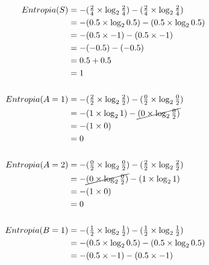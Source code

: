 \documentclass[
    article,            %
    11pt,               %
    oneside,            %
    a4paper,            %
    english,            %
    brazil,             %
    sumario=tradicional,
    ]{abntex2}
\begin{document}
\begin{align*}
Entropia(S) &= - (\tfrac{2}{4} \times \log_2 \tfrac{2}{4}) - (\tfrac{2}{4} \times \log_2 \tfrac{2}{4})   \\ 
            &= - (0.5 \times \log_2 0.5) - (0.5 \times \log_2 0.5)                                       \\
            &= - (0.5 \times -1) - (0.5 \times -1)                                                       \\
            &= - (-0.5) - (-0.5)                                                                         \\
            &= 0.5 + 0.5                                                                                 \\
            &= 1                                                                                       \\\\
Entropia(A=1) &= - (\tfrac{2}{2} \times \log_2 \tfrac{2}{2}) - (\tfrac{0}{2} \times \log_2 \tfrac{0}{2}) \\ 
              &= - (1 \times \log_2 1) - \cancel{(0 \times \log_2 \tfrac{0}{2})}                         \\
              &= - (1 \times 0)                                                                          \\
              &= 0                                                                                     \\\\
Entropia(A=2) &= - (\tfrac{0}{2} \times \log_2 \tfrac{0}{2}) - (\tfrac{2}{2} \times \log_2 \tfrac{2}{2}) \\ 
              &= - \cancel{(0 \times \log_2 \tfrac{0}{2})} - (1 \times \log_2 1)                         \\
              &= - (1 \times 0)                                                                          \\
              &= 0                                                                                     \\\\
Entropia(B=1) &= - (\tfrac{1}{2} \times \log_2 \tfrac{1}{2}) - (\tfrac{1}{2} \times \log_2 \tfrac{1}{2}) \\ 
              &= - (0.5 \times \log_2 0.5) - (0.5 \times \log_2 0.5)                                     \\
              &= - (0.5 \times -1) - (0.5 \times -1)                                                     \\

\end{align*}
\end{document}
